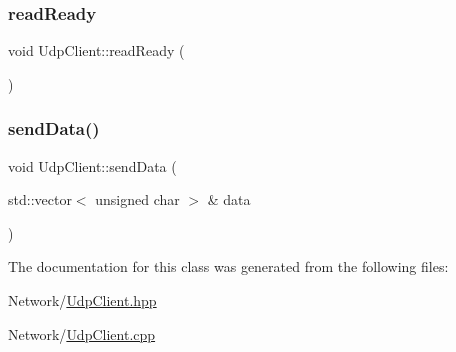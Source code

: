 \subsubsection{\texorpdfstring{read\+Ready}{readReady}}
{\footnotesize\ttfamily void Udp\+Client\+::read\+Ready (\begin{DoxyParamCaption}{ }\end{DoxyParamCaption})\hspace{0.3cm}{\ttfamily [slot]}}

\mbox{\label{classUdpClient_a3fb3b0467e3ee8dda9609c3252e57d41}} 
\subsubsection{\texorpdfstring{send\+Data()}{sendData()}}
{\footnotesize\ttfamily void Udp\+Client\+::send\+Data (\begin{DoxyParamCaption}\item[{std\+::vector$<$ unsigned char $>$ \&}]{data }\end{DoxyParamCaption})}



The documentation for this class was generated from the following files\+:\begin{DoxyCompactItemize}
\item 
Network/\mbox{\hyperlink{UdpClient_8hpp}{Udp\+Client.\+hpp}}\item 
Network/\mbox{\hyperlink{UdpClient_8cpp}{Udp\+Client.\+cpp}}\end{DoxyCompactItemize}
